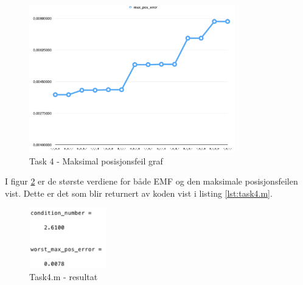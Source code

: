 \begin{figure}
		\centering
		\includegraphics[width=0.8\textwidth]{sections/Exercise4/task4max_pos_error_graph.png}
		    \caption{Task 4 - Maksimal posisjonsfeil graf}
		    \label{fig:task4max_pos_error_graph}
	\end{figure}



I figur \ref{fig:task4answer} er de største verdiene for både EMF og den maksimale posisjonsfeilen vist. Dette er det som blir returnert av koden vist i listing \ref{lst:task4.m}. 

\begin{figure}[h]
	\centering
	\includegraphics[width=0.3\textwidth]{sections/Exercise4/task4answer.png}
	\caption{Task4.m - resultat}
	\label{fig:task4answer}
\end{figure}